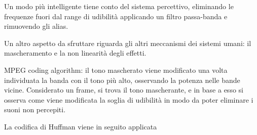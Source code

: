  Un modo più intelligente tiene conto del sistema percettivo, eliminando le frequenze fuori dal range di udibilità applicando un filtro passa-banda e rimuovendo gli alias. 
 
 Un altro aspetto da sfruttare riguarda gli altri meccanismi dei sistemi umani: il mascheramento e la non linearità degli effetti. 
 
 
 
 MPEG coding algorithm: il tono mascherato viene modificato una volta individuata la banda con il tono più alto, osservando la potenza nelle bande vicine. Considerato un frame, si trova il tono mascherante, e in base a esso si osserva come viene modificata la soglia di udibilità in modo da poter eliminare i suoni non percepiti. 
 
La codifica di Huffman viene in seguito applicata
